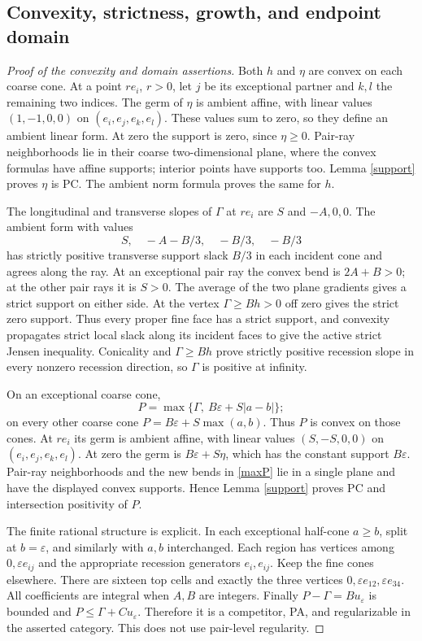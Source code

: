 \documentclass[11pt]{article}
\newcommand{\eps}{\varepsilon}
\begin{document}
\subsection{Convexity, strictness, growth, and endpoint domain}
\begin{proof}[Proof of the convexity and domain assertions]
Both $h$ and $\eta$ are convex on each coarse cone. At a point $r e_i$, $r>0$, let $j$ be its exceptional partner and $k,l$ the remaining two indices. The germ of $\eta$ is ambient affine, with linear values $(1,-1,0,0)$ on $(e_i,e_j,e_k,e_l)$. These values sum to zero, so they define an ambient linear form. At zero the support is zero, since $\eta\geq0$. Pair-ray neighborhoods lie in their coarse two-dimensional plane, where the convex formulas have affine supports; interior points have supports too. Lemma \ref{support} proves $\eta$ is PC. The ambient norm formula proves the same for $h$.

The longitudinal and transverse slopes of $\Gamma$ at $r e_i$ are $S$ and $-A,0,0$. The ambient form with values
\[S,\quad -A-B/3,\quad-B/3,\quad-B/3\]
has strictly positive transverse support slack $B/3$ in each incident cone and agrees along the ray. At an exceptional pair ray the convex bend is $2A+B>0$; at the other pair rays it is $S>0$. The average of the two plane gradients gives a strict support on either side. At the vertex $\Gamma\geq B h>0$ off zero gives the strict zero support. Thus every proper fine face has a strict support, and convexity propagates strict local slack along its incident faces to give the active strict Jensen inequality. Conicality and $\Gamma\geq B h$ prove strictly positive recession slope in every nonzero recession direction, so $\Gamma$ is positive at infinity.

On an exceptional coarse cone,
\begin{equation}\label{maxP}P=\max\{\Gamma,\ B\eps+S|a-b|\};\end{equation}
on every other coarse cone $P=B\eps+S\max(a,b)$. Thus $P$ is convex on those cones. At $r e_i$ its germ is ambient affine, with linear values $(S,-S,0,0)$ on $(e_i,e_j,e_k,e_l)$. At zero the germ is $B\eps+S\eta$, which has the constant support $B\eps$. Pair-ray neighborhoods and the new bends in \eqref{maxP} lie in a single plane and have the displayed convex supports. Hence Lemma \ref{support} proves PC and intersection positivity of $P$.

The finite rational structure is explicit. In each exceptional half-cone $a\geq b$, split at $b=\eps$, and similarly with $a,b$ interchanged. Each region has vertices among $0,\eps e_{ij}$ and the appropriate recession generators $e_i,e_{ij}$. Keep the fine cones elsewhere. There are sixteen top cells and exactly the three vertices $0,\eps e_{12},\eps e_{34}$. All coefficients are integral when $A,B$ are integers. Finally $P-\Gamma=B u_\eps$ is bounded and $P\leq\Gamma+C u_\eps$. Therefore it is a competitor, PA, and regularizable in the asserted category. This does not use pair-level regularity.
\end{proof}
\end{document}
